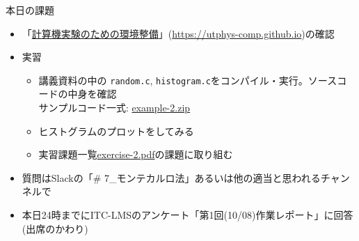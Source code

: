 \documentclass[10pt,dvipdfmx]{beamer}
\begin{document}
\begin{frame}[t]{本日の課題}
  \begin{itemize}
  \item 「\href{https://utphys-comp.github.io}{計算機実験のための環境整備}」({\small \href{https://utphys-comp.github.io}{https://utphys-comp.github.io}})の確認
  \item 実習
    \begin{itemize}
    \item 講義資料の中の {\tt random.c}, {\tt histogram.c}をコンパイル・実行。ソースコードの中身を確認 \\
      サンプルコード一式: \href{https://github.com/todo-group/ComputerExperiments/releases/tag/2021a-computer2}{example-2.zip}
    \item ヒストグラムのプロットをしてみる
    \item 実習課題一覧\href{https://github.com/todo-group/ComputerExperiments/releases/tag/2021a-computer2}{exercise-2.pdf}の課題に取り組む
    \end{itemize}
  \item 質問はSlackの「\# 7\_モンテカルロ法」あるいは他の適当と思われるチャンネルで
  \item 本日24時までにITC-LMSのアンケート「第1回(10/08)作業レポート」に回答(出席のかわり)
  \end{itemize}
\end{frame}
\end{document}
